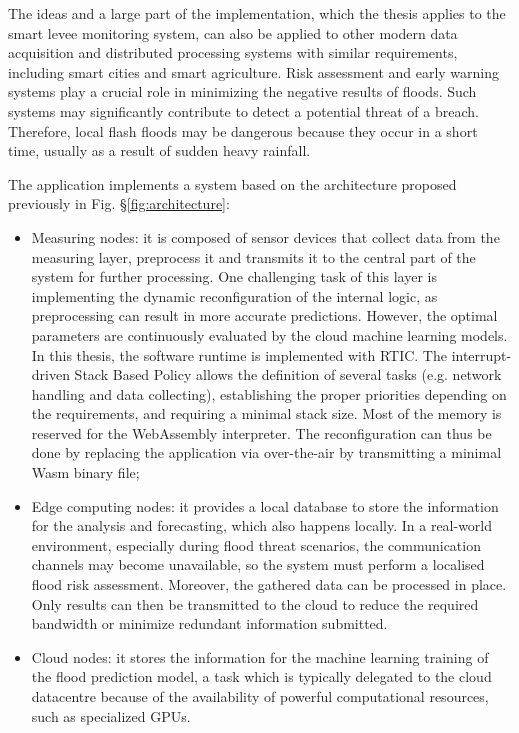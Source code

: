 The ideas and a large part of the implementation, which the thesis applies to the smart levee monitoring system, can also be applied to other modern data acquisition and distributed processing systems with similar requirements, including smart cities and smart agriculture. Risk assessment and early warning systems play a crucial role in minimizing the negative results of floods. Such systems may significantly contribute to detect a potential threat of a breach. Therefore, local flash floods may be dangerous because they occur in a short time, usually as a result of sudden heavy rainfall.

The application implements a system based on the architecture proposed previously in Fig. §\ref{fig:architecture}:

\begin{itemize}
    \item Measuring nodes: it is composed of sensor devices that collect data from the measuring layer, preprocess it and transmits it to the central part of the system for further processing. One challenging task of this layer is implementing the dynamic reconfiguration of the internal logic, as preprocessing can result in more accurate predictions. However, the optimal parameters are continuously evaluated by the cloud machine learning models. In this thesis, the software runtime is implemented with RTIC. The interrupt-driven Stack Based Policy allows the definition of several tasks (e.g. network handling and data collecting), establishing the proper priorities depending on the requirements, and requiring a minimal stack size. Most of the memory is reserved for the WebAssembly interpreter. The reconfiguration can thus be done by replacing the application via over-the-air by transmitting a minimal Wasm binary file;
    \item Edge computing nodes: it provides a local database to store the information for the analysis and forecasting, which also happens locally. In a real-world environment, especially during flood threat scenarios, the communication channels may become unavailable, so the system must perform a localised flood risk assessment. Moreover, the gathered data can be processed in place. Only results can then be transmitted to the cloud to reduce the required bandwidth or minimize redundant information submitted. 
    \item Cloud nodes: it stores the information for the machine learning training of the flood prediction model, a task which is typically delegated to the cloud datacentre because of the availability of powerful computational resources, such as specialized GPUs.
\end{itemize}

